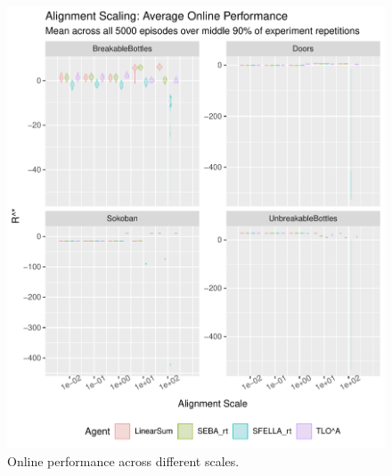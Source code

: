 \begin{figure}
  \includegraphics[width=\columnwidth]{output/multirun_n100_reward_to_util_transformonline_util_transform_Alignment.pdf}
  \caption{Online performance across different scales. 
  }
   \label{fig:online_performance_exp2}
 \end{figure}